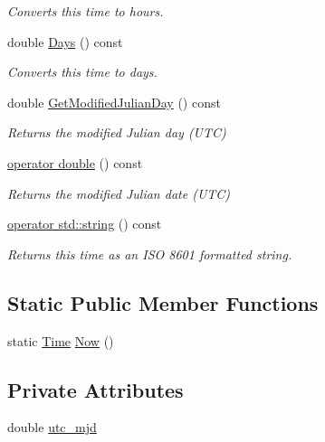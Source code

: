 \begin{DoxyCompactItemize}
\begin{DoxyCompactList}\small\item\em Converts this time to hours. \end{DoxyCompactList}\item 
double \hyperlink{classcubesat_1_1Time_a7e144b7b0faa263d897f9626344630b7}{Days} () const
\begin{DoxyCompactList}\small\item\em Converts this time to days. \end{DoxyCompactList}\item 
double \hyperlink{classcubesat_1_1Time_a40a9425d3b4217d0ed774a8f055346dc}{Get\+Modified\+Julian\+Day} () const
\begin{DoxyCompactList}\small\item\em Returns the modified Julian day (U\+TC) \end{DoxyCompactList}\item 
\hyperlink{classcubesat_1_1Time_a8a5fbb59414b8e28ef335d89735b8b5f}{operator double} () const
\begin{DoxyCompactList}\small\item\em Returns the modified Julian date (U\+TC) \end{DoxyCompactList}\item 
\hyperlink{classcubesat_1_1Time_aff75f18fae255dac06e7be38e01253b3}{operator std\+::string} () const
\begin{DoxyCompactList}\small\item\em Returns this time as an I\+SO 8601 formatted string. \end{DoxyCompactList}\end{DoxyCompactItemize}
\subsection*{Static Public Member Functions}
\begin{DoxyCompactItemize}
\item 
static \hyperlink{classcubesat_1_1Time}{Time} \hyperlink{classcubesat_1_1Time_a2ae34a0de97cc4bda96cd917ea414a7b}{Now} ()
\end{DoxyCompactItemize}
\subsection*{Private Attributes}
\begin{DoxyCompactItemize}
\item 
double \hyperlink{classcubesat_1_1Time_a8b8595226e81cc29bdb5d6b32d9a188c}{utc\+\_\+mjd}
\end{DoxyCompactItemize}


